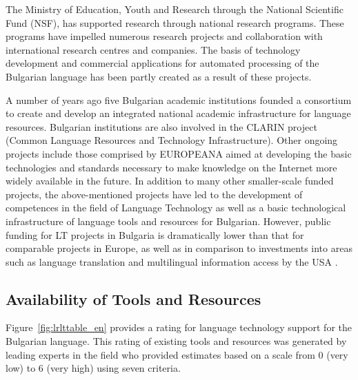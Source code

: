 \begin{multicols}{2}
  The Ministry of Education, Youth and Research through the National Scientific Fund (NSF), has supported research through national research programs. These programs have impelled numerous research projects and collaboration with international research centres and companies. The basis of technology development and commercial applications for automated processing of the Bulgarian language has been partly created as a result of these projects.

  A number of years ago five Bulgarian academic institutions founded a consortium to create and develop an integrated national academic infrastructure for language resources. Bulgarian institutions are also involved in the CLARIN project (Common Language Resources and Technology Infrastructure). Other ongoing projects include those comprised by EUROPEANA aimed at developing the basic technologies and standards necessary to make knowledge on the Internet more widely available in the future. In addition to many other smaller-scale funded projects, the above-mentioned projects have led to the development of competences in the field of Language Technology as well as a basic technological infrastructure of language tools and resources for Bulgarian. However, public funding for LT projects in Bulgaria is dramatically lower than that for comparable projects in Europe, as well as in comparison to investments into areas such as language translation and multilingual information access by
    the USA \cite{sprachtech}.  

  \subsection{Availability of Tools and Resources}

  Figure~\ref{fig:lrlttable_en} provides a rating for language technology support for the Bulgarian language. This rating of existing tools and resources was generated by leading experts in the field who provided estimates based on a scale from 0 (very low) to 6 (very high) using seven criteria.


\end{multicols}
